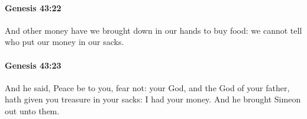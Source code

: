 		\paragraph{Genesis 43:22} %
			\label{GENESIS-43-22}

			And other money have we brought down in our hands to buy food: we cannot tell who put our money in our sacks.


		\paragraph{Genesis 43:23} %
			\label{GENESIS-43-23}

			And he said, Peace be to you, fear not: your God, and the God of your father, hath given you treasure in your sacks: I had your money. And he brought Simeon out unto them.



